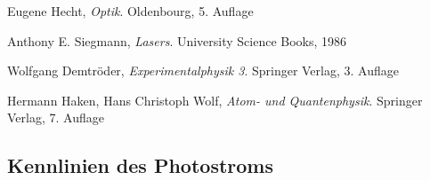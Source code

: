 \documentclass[11pt, a4paper]{article}
\numberwithin{equation}{section}
\begin{document}

\begin{thebibliography}{9}

	Eugene Hecht,
	\emph{Optik}.
	Oldenbourg,
	5. Auflage
	
	Anthony E. Siegmann,
	\emph{Lasers}.
	University Science Books,
	1986
	
	Wolfgang Demtröder,
	\emph{Experimentalphysik 3}.
	Springer Verlag,
	3. Auflage
 
	Hermann Haken, Hans Christoph Wolf,
	\emph{Atom- und Quantenphysik}.
	Springer Verlag,
	7. Auflage
 
\end{thebibliography}

\clearpage

\begin{appendix}
\section{Kennlinien des Photostroms}
\label{app:kennlinien}
\FloatBarrier


\end{appendix}
\end{document}
